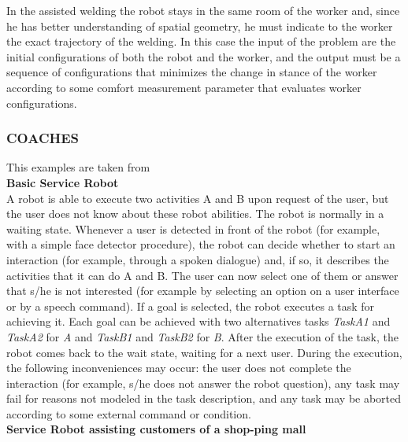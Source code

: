 \documentclass[pdftex,12pt,a4paper]{report}
\begin{document}
\noindent In the assisted welding the robot stays in the same room of the worker and, since he has better understanding of spatial geometry, he must indicate to the worker the exact trajectory of the welding.
In this case the input of the problem are the initial configurations of both the robot and the worker, and the output must be a sequence of configurations that minimizes the change in stance of the worker according to some comfort measurement parameter that evaluates worker configurations.

\subsubsection{COACHES}
This examples are taken from \cite{iocchi2016practical}%
\newline
\\\noindent \textbf{Basic Service Robot}\\
A robot is able to execute two activities A and B upon request of the user, but the user does not know about these robot abilities. The robot is normally in a waiting state. Whenever a user is detected in front of the robot (for example, with a simple face detector procedure), the robot can decide whether to start an interaction (for example, through a spoken dialogue) and, if so, it describes the activities that it can do A and B. The user can now select one of them or answer that s/he is not interested (for example by selecting an option on a user interface or by a speech command). If a goal is selected, the robot executes a task for achieving it. Each goal can be achieved with two alternatives tasks \textit{TaskA1} and \textit{TaskA2} for \textit{A} and \textit{TaskB1} and \textit{TaskB2} for \textit{B}. After the execution of the task, the robot comes back to the wait state, waiting for a next user. During the execution, the following inconveniences may occur: the user does not complete the interaction (for example, s/he does not answer the robot question), any task may fail for reasons not modeled in the task description, and any task may be aborted according to some external command or condition.
\newline
\\\noindent \textbf{Service Robot assisting customers of a shop-ping mall}\\
\end{document}
